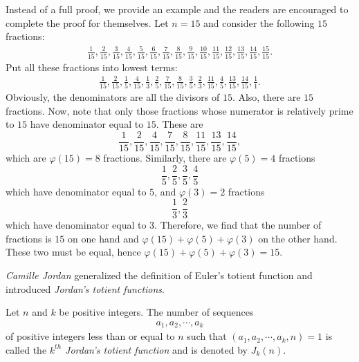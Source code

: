\documentclass[12pt]{subfile}
\begin{document}
			Instead of a full proof, we provide an example and the readers  are encouraged to complete the proof for themselves. Let $n=15$ and consider the following $15$ fractions:
				\begin{align*}
					\frac{1}{15}, 
					\frac{2}{15}, 
					\frac{3}{15}, 
					\frac{4}{15}, 
					\frac{5}{15},
					\frac{6}{15}, 
					\frac{7}{15},
					\frac{8}{15}, 
					\frac{9}{15}, 
					\frac{10}{15},
					\frac{11}{15}, 
					\frac{12}{15}, 
					\frac{13}{15}, 
					\frac{14}{15},
					\frac{15}{15}.
				\end{align*}
			Put all these fractions into lowest terms:
				\begin{align*}
					\frac{1}{15}, 
					\frac{2}{15}, 
					\frac{1}{5}, 
					\frac{4}{15}, 
					\frac{1}{3},
					\frac{2}{5}, 
					\frac{7}{15},
					\frac{8}{15}, 
					\frac{3}{5}, 
					\frac{2}{3},
					\frac{11}{15}, 
					\frac{4}{5}, 
					\frac{13}{15}, 
					\frac{14}{15},
					\frac{1}{1}.					
				\end{align*}
			Obviously, the denominators are all the divisors of $15$. Also, there are $15$ fractions. Now, note that only those fractions whose numerator is relatively prime to $15$ have denominator equal to $15$. These are $$ \frac{1}{15}, \frac{2}{15},\frac{4}{15},\frac{7}{15},\frac{8}{15},\frac{11}{15},\frac{13}{15},\frac{14}{15},$$ which are $\varphi(15)=8$ fractions. Similarly, there are $\varphi(5)=4$ fractions $$ \frac{1}{5},\frac{2}{5},\frac{3}{5},\frac{4}{5} $$ which have denominator equal to $5$, and $\varphi(3)=2$ fractions $$ \frac{1}{3},\frac{2}{3}$$ which have denominator equal to $3$. Therefore, we find that the number of fractions is $15$ on one hand and $\varphi(15)+\varphi(5)+\varphi(3)$ on the other hand. These two must be equal, hence $\varphi(15)+\varphi(5)+\varphi(3)=15$.
	
	\textit{Camille Jordan} generalized the definition of Euler's totient function and introduced \textit{Jordan's totient functions}.
		
		\begin{definition}
			Let $n$ and $k$ be positive integers. The number of sequences
				\begin{align*}
					a_1, a_2, \cdots, a_k
				\end{align*}
			of positive integers less than or equal to $n$ such that $(a_1,a_2,\cdots,a_k,n)=1$ is called the \textit{$k^{th}$ Jordan's totient function} and is denoted by $J_k(n)$.
		\end{definition}
		
\end{document}
